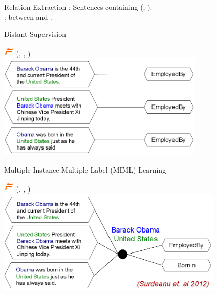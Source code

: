 \begin{frame}{Relation Extraction}
  :  Sentences containing (, ). \\
  :  between  and .
\end{frame}


\begin{frame}{Distant Supervision}
\begin{center}
  \includegraphics[height=0.5cm]{../img/freebase-logo.jpg} \hspace{0.5cm} (, , ) \\
  \vspace{0.5cm}
  \includegraphics[height=5cm]{../img/distsup-naive.png}
\end{center}
\end{frame}

\begin{frame}[noframenumbering]{Multiple-Instance Multiple-Label (MIML) Learning}
\begin{center}
  \includegraphics[height=0.5cm]{../img/freebase-logo.jpg} \hspace{0.5cm} (, , ) \\
  \vspace{0.5cm}
\includegraphics[height=5cm]{../img/distsup-miml.png}
\end{center}
\end{frame}

